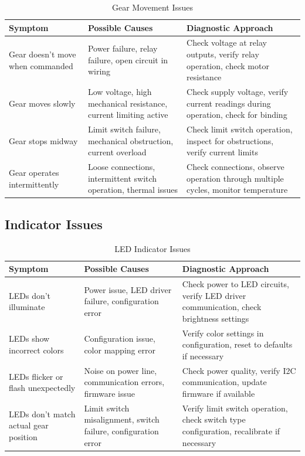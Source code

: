 \documentclass[12pt,a4paper,twoside,openright]{book}
\newcommand{\tabletextfont}{\normalfont\rmfamily}
\newcommand{\tableheadfont}{\normalfont\bfseries}
\begin{document}
\begin{table}[h]
\centering
\setlength{\tabcolsep}{5pt} %
\begin{tabular}{|p{}|p{}|p{}|}
\hline
\tableheadfont\textbf{Symptom} & \tableheadfont\textbf{Possible Causes} & \tableheadfont\textbf{Diagnostic Approach} \\
\hline
\tabletextfont Gear doesn't move when commanded & Power failure, relay failure, open circuit in wiring & Check voltage at relay outputs, verify relay operation, check motor resistance \\
\hline
\tabletextfont Gear moves slowly & Low voltage, high mechanical resistance, current limiting active & Check supply voltage, verify current readings during operation, check for binding \\
\hline
\tabletextfont Gear stops midway & Limit switch failure, mechanical obstruction, current overload & Check limit switch operation, inspect for obstructions, verify current limits \\
\hline
\tabletextfont Gear operates intermittently & Loose connections, intermittent switch operation, thermal issues & Check connections, observe operation through multiple cycles, monitor temperature \\
\hline
\end{tabular}
\caption{Gear Movement Issues}
\end{table}

\subsection{Indicator Issues}

\begin{table}[h]
\centering
\setlength{\tabcolsep}{5pt} %
\begin{tabular}{|p{}|p{}|p{}|}
\hline
\tableheadfont\textbf{Symptom} & \tableheadfont\textbf{Possible Causes} & \tableheadfont\textbf{Diagnostic Approach} \\
\hline
\tabletextfont LEDs don't illuminate & Power issue, LED driver failure, configuration error & Check power to LED circuits, verify LED driver communication, check brightness settings \\
\hline
\tabletextfont LEDs show incorrect colors & Configuration issue, color mapping error & Verify color settings in configuration, reset to defaults if necessary \\
\hline
\tabletextfont LEDs flicker or flash unexpectedly & Noise on power line, communication errors, firmware issue & Check power quality, verify I2C communication, update firmware if available \\
\hline
\tabletextfont LEDs don't match actual gear position & Limit switch misalignment, switch failure, configuration error & Verify limit switch operation, check switch type configuration, recalibrate if necessary \\
\hline
\end{tabular}
\caption{LED Indicator Issues}
\end{table}
\end{document}
